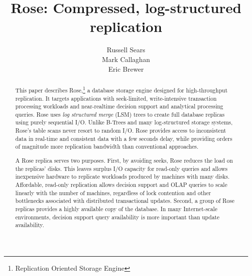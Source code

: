 \documentclass{vldb}
\newcommand{\rows}{Rose\xspace}
\newcommand{\rowss}{Rose's\xspace}
\begin{document}
\title{{\ttlit \rows}: Compressed, log-structured replication}
%
%
\author{
\alignauthor
Russell Sears\\
\alignauthor
Mark Callaghan\\
\alignauthor
Eric Brewer\\
}
\maketitle
\begin{abstract}
This paper describes \rows,\footnote{Replication Oriented Storage Engine} a database
storage engine designed for high-throughput replication.  It targets
applications with seek-limited, write-intensive transaction
processing workloads and near-realtime decision support and analytical
processing queries.  \rows uses {\em log structured merge} (LSM) trees
to create full database replicas using purely sequential I/O.  Unlike B-Trees
and many log-structured storage systems, \rowss table scans never resort to random I/O.  \rows
provides access to inconsistent data in real-time and consistent data
with a few seconds delay, while providing orders of magnitude more
replication bandwidth than conventional approaches.

A \rows replica serves two purposes.  First, by avoiding seeks, \rows
reduces the load on the replicas' disks.  This leaves surplus I/O capacity
for read-only queries and allows inexpensive hardware to replicate
workloads produced by machines with many disks.
Affordable, read-only replication allows decision support and OLAP queries to
scale linearly with the number of machines, regardless of lock
contention and other bottlenecks associated with distributed
transactional updates.  Second, a group of \rows replicas provides a highly
available copy of the database.  In many Internet-scale environments,
decision support query availability is more important than update availability.



\end{abstract}
\end{document}
